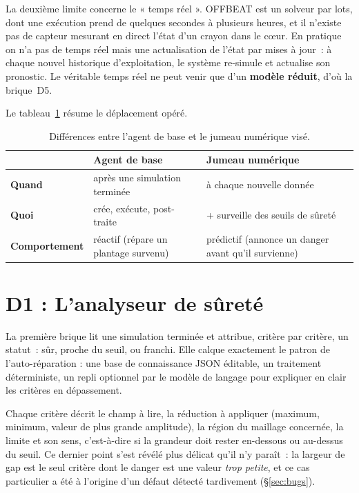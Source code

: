 \documentclass[12pt,a4paper,french]{report}
\begin{document}
La deuxième limite concerne le « temps réel ». OFFBEAT est un solveur par lots,
dont une exécution prend de quelques secondes à plusieurs heures, et il
n'existe pas de capteur mesurant en direct l'état d'un crayon dans le c\oe ur.
En pratique on n'a pas de temps réel mais une actualisation de l'état par mises à jour~: à chaque nouvel historique
d'exploitation, le système re-simule et actualise son pronostic. Le véritable
temps réel ne peut venir que d'un \textbf{modèle réduit}, d'où la brique~D5.

Le tableau~\ref{tab:agent-vs-twin} résume le déplacement opéré.

\begin{table}[htbp]
\centering
\caption[Agent de base et jumeau numérique]{Différences entre l'agent de base et le jumeau numérique visé.}
\label{tab:agent-vs-twin}
\begin{tabularx}{0.95\textwidth}{@{}lXX@{}}
\toprule
 & \textbf{Agent de base} & \textbf{Jumeau numérique}\\
\midrule
\textbf{Quand} & après une simulation terminée & à chaque nouvelle donnée\\
\textbf{Quoi} & crée, exécute, post-traite & + surveille des seuils de sûreté\\
\textbf{Comportement} & réactif (répare un plantage survenu) &
  prédictif (annonce un danger avant qu'il survienne)\\
\bottomrule
\end{tabularx}
\end{table}

\section{D1 : L'analyseur de sûreté}

La première brique lit une simulation terminée et attribue, critère par
critère, un statut~: sûr, proche du seuil, ou franchi. Elle calque exactement le
patron de l'auto-réparation : une base de connaissance JSON éditable, un
traitement déterministe, un repli optionnel par le modèle de langage pour
expliquer en clair les critères en dépassement.

Chaque critère décrit le champ à lire, la réduction à appliquer (maximum,
minimum, valeur de plus grande amplitude), la région du maillage concernée, la
limite et son sens, c'est-à-dire si la grandeur doit rester en-dessous ou au-dessus du
seuil. Ce dernier point s'est révélé plus délicat qu'il n'y paraît~: la largeur
de gap est le seul critère dont le danger est une valeur \textit{trop petite},
et ce cas particulier a été à l'origine d'un défaut détecté tardivement
(§\ref{sec:bugs}).
\end{document}
